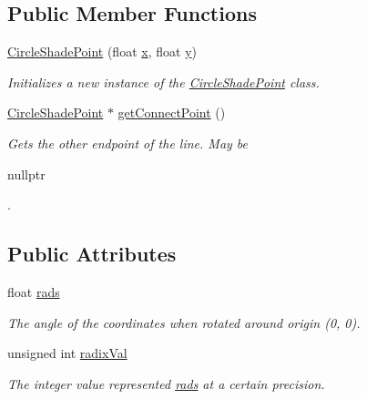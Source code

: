 \subsection*{Public Member Functions}
\begin{DoxyCompactItemize}
\item 
\hyperlink{classlighting_1_1CircleShadePoint_aef73e6c1a0e5ee8a099cbce37a7ab919}{Circle\+Shade\+Point} (float \hyperlink{classlighting_1_1ShadePoint_a087db3eacccf6731f674f123c22400ec}{x}, float \hyperlink{classlighting_1_1ShadePoint_a427350496a448f0dd7424955a6c21ea2}{y})
\begin{DoxyCompactList}\small\item\em Initializes a new instance of the \hyperlink{classlighting_1_1CircleShadePoint}{Circle\+Shade\+Point} class. \end{DoxyCompactList}\item 
\hyperlink{classlighting_1_1CircleShadePoint}{Circle\+Shade\+Point} $\ast$ \hyperlink{classlighting_1_1CircleShadePoint_aada35a7aca1f2aaecc9bf0e1ecc67ee1}{get\+Connect\+Point} ()
\begin{DoxyCompactList}\small\item\em Gets the other endpoint of the line. May be 
\begin{DoxyCode}
\textcolor{keyword}{nullptr}
\end{DoxyCode}
. \end{DoxyCompactList}\end{DoxyCompactItemize}
\subsection*{Public Attributes}
\begin{DoxyCompactItemize}
\item 
float \hyperlink{classlighting_1_1CircleShadePoint_a4b174fb379fd8d03ba4a5c47877b38ac}{rads}
\begin{DoxyCompactList}\small\item\em The angle of the coordinates when rotated around origin (0, 0). \end{DoxyCompactList}\item 
unsigned int \hyperlink{classlighting_1_1CircleShadePoint_a3a48629b0aebab194ab7d139d496c2da}{radix\+Val}
\begin{DoxyCompactList}\small\item\em The integer value represented \hyperlink{classlighting_1_1CircleShadePoint_a4b174fb379fd8d03ba4a5c47877b38ac}{rads} at a certain precision. \end{DoxyCompactList}\end{DoxyCompactItemize}
